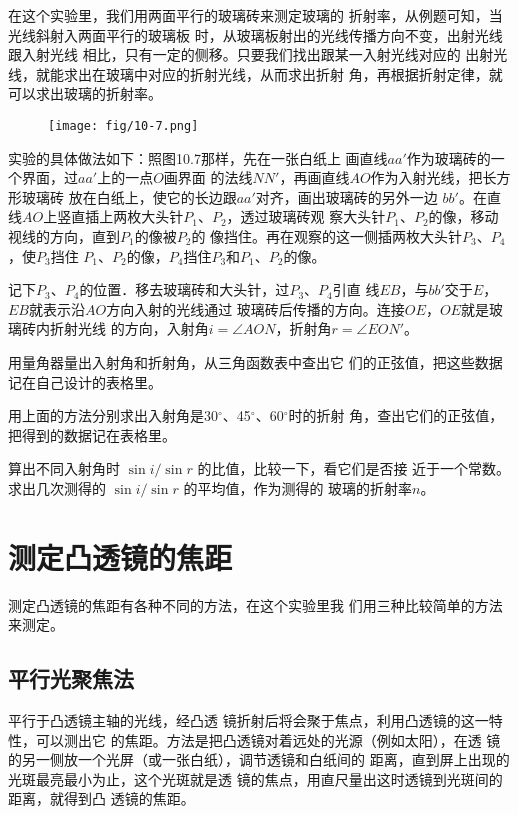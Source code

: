 在这个实验里，我们用两面平行的玻璃砖来测定玻璃的
折射率，从例题可知，当光线斜射入两面平行的玻璃板
时，从玻璃板射出的光线传播方向不变，出射光线跟入射光线
相比，只有一定的侧移。只要我们找出跟某一入射光线对应的
出射光线，就能求出在玻璃中对应的折射光线，从而求出折射
角，再根据折射定律，就可以求出玻璃的折射率。
\begin{figure}[htp]\centering
    \texttt{[image: fig/10-7.png]}
    \caption{}
    \end{figure}

实验的具体做法如下：照图10.7那样，先在一张白纸上
画直线$aa'$作为玻璃砖的一个界面，过$aa'$上的一点$O$画界面
的法线$NN'$，再画直线$AO$作为入射光线，把长方形玻璃砖
放在白纸上，使它的长边跟$aa'$对齐，画出玻璃砖的另外一边
$bb'$。在直线$AO$上竖直插上两枚大头针$P_1$、$P_2$，透过玻璃砖观
察大头针$P_1$、$P_2$的像，移动视线的方向，直到$P_1$的像被$P_2$的
像挡住。再在观察的这一侧插两枚大头针$P_3$、$P_4$，使$P_3$挡住
$P_1$、$P_2$的像，$P_4$挡住$P_3$和$P_1$、$P_2$的像。


记下$P_3$、$P_4$的位置．移去玻璃砖和大头针，过$P_3$、$P_4$引直
线$EB$，与$bb'$交于$E$，$EB$就表示沿$AO$方向入射的光线通过
玻璃砖后传播的方向。连接$OE$，$OE$就是玻璃砖内折射光线
的方向，入射角$i=\angle AON$，折射角$r=\angle EON'$。

用量角器量出入射角和折射角，从三角函数表中查出它
们的正弦值，把这些数据记在自己设计的表格里。

用上面的方法分别求出入射角是30$^\circ$、45$^\circ$、60$^\circ$时的折射
角，查出它们的正弦值，把得到的数据记在表格里。

算出不同入射角时
$\sin i/\sin r$
的比值，比较一下，看它们是否接
近于一个常数。求出几次测得的
$\sin i/\sin r$
的平均值，作为测得的
玻璃的折射率$n$。

\section{测定凸透镜的焦距}
测定凸透镜的焦距有各种不同的方法，在这个实验里我
们用三种比较简单的方法来测定。

\subsection{平行光聚焦法}

平行于凸透镜主轴的光线，经凸透
镜折射后将会聚于焦点，利用凸透镜的这一特性，可以测出它
的焦距。方法是把凸透镜对着远处的光源（例如太阳），在透
镜的另一侧放一个光屏（或一张白纸），调节透镜和白纸间的
距离，直到屏上出现的光斑最亮最小为止，这个光斑就是透
镜的焦点，用直尺量出这时透镜到光斑间的距离，就得到凸
透镜的焦距。

